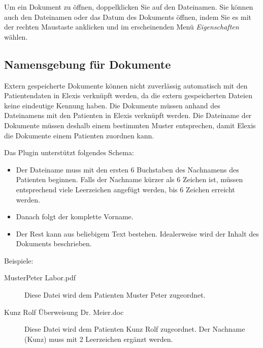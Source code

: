Um ein Dokument zu öffnen, doppelklicken Sie auf den Dateinamen. Sie können
auch den Dateinamen oder das Datum des Dokuments öffnen, indem Sie es mit
der rechten Maustaste anklicken und im erscheinenden Menü \textit{Eigenschaften}
wählen.

\subsection{Namensgebung für Dokumente}

Extern gespeicherte Dokumente können nicht zuverlässig automatisch mit
den Patientendaten in Elexis verknüpft werden, da die extern gespeicherten
Dateien keine eindeutige Kennung haben. Die Dokumente müssen anhand des
Dateinamens mit den Patienten in Elexis verknüpft werden. Die Dateiname der
Dokumente müssen deshalb einem bestimmten Muster entsprechen, damit Elexis
die Dokumente einem Patienten zuordnen kann.

Das Plugin unterstützt folgendes Schema:

\begin{itemize}
\item Der Dateiname muss mit den ersten 6 Buchstaben des Nachnamens des Patienten beginnen.
      Falls der Nachname kürzer als 6 Zeichen ist, müssen entsprechend viele
      Leerzeichen angefügt werden, bis 6 Zeichen erreicht werden.
\item Danach folgt der komplette Vorname.
\item Der Rest kann aus beliebigem Text bestehen. Idealerweise wird der Inhalt
      des Dokuments beschrieben.
\end{itemize}

Beispiele:

\begin{description}
\item[MusterPeter Labor.pdf]
Diese Datei wird dem Patienten Muster Peter zugeordnet.
\item[Kunz  Rolf Überweisung Dr. Meier.doc]
Diese Datei wird dem Patienten Kunz Rolf zugeordnet. Der Nachname (Kunz) muss
mit 2 Leerzeichen ergänzt werden.
\end{description}
